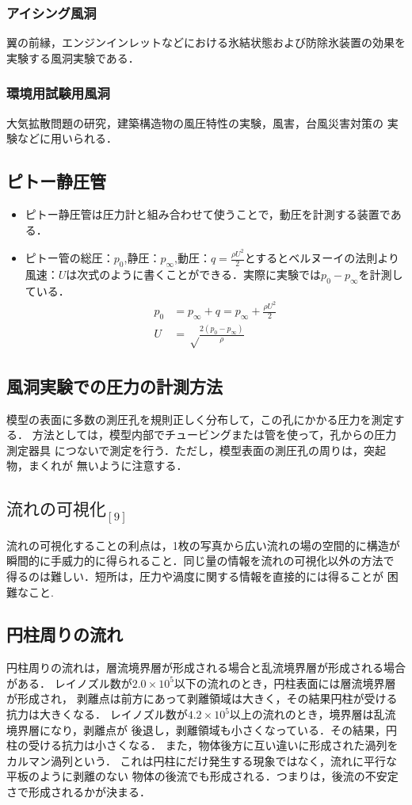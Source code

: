 \documentclass[a4paper,titlepage]{ltjsarticle}
\begin{document}
 \subsubsection{アイシング風洞}
 翼の前縁，エンジンインレットなどにおける氷結状態および防除氷装置の効果を
 実験する風洞実験である．

 \subsubsection{環境用試験用風洞}
  大気拡散問題の研究，建築構造物の風圧特性の実験，風害，台風災害対策の
 実験などに用いられる．

 \subsection*{ピトー静圧管}
 \begin{itemize}
  \item ピトー静圧管は圧力計と組み合わせて使うことで，動圧を計測する装置である．
  \item ピトー管の総圧：$p_0$,静圧：$p_\infty$,動圧：$q=\frac{\rho U^2}{2}$とするとベルヌーイの法則より風速：$U$は次式のように書くことができる．実際に実験では$p_0-p_\infty$を計測している．
  \begin{align}
    p_0&=p_\infty+q=p_\infty+\frac{\rho U^2}{2}\\ 
    U&=\sqrt \frac{2(p_0-p_\infty)}{\rho }
  \end{align}
 \end{itemize}

 \subsection{風洞実験での圧力の計測方法}
 模型の表面に多数の測圧孔を規則正しく分布して，この孔にかかる圧力を測定する．
 方法としては，模型内部でチュービングまたは管を使って，孔からの圧力測定器具
 につないで測定を行う．ただし，模型表面の測圧孔の周りは，突起物，まくれが
 無いように注意する．

\subsection{$流れの可視化_{[9]}$}
流れの可視化することの利点は，1枚の写真から広い流れの場の空間的に構造が
瞬間的に手威力的に得られること．同じ量の情報を流れの可視化以外の方法で
得るのは難しい．短所は，圧力や渦度に関する情報を直接的には得ることが
困難なこと.

\subsection{円柱周りの流れ}
円柱周りの流れは，層流境界層が形成される場合と乱流境界層が形成される場合がある．
レイノズル数が$2.0\times10^{5}$以下の流れのとき，円柱表面には層流境界層が形成され，
剥離点は前方にあって剥離領域は大きく，その結果円柱が受ける抗力は大きくなる．
レイノズル数が$4.2\times10^{5}$以上の流れのとき，境界層は乱流境界層になり，剥離点が
後退し，剥離領域も小さくなっている．その結果，円柱の受ける抗力は小さくなる．
また，物体後方に互い違いに形成された渦列をカルマン渦列という．
これは円柱にだけ発生する現象ではなく，流れに平行な平板のように剥離のない
物体の後流でも形成される．つまりは，後流の不安定さで形成されるかが決まる．
\end{document}
